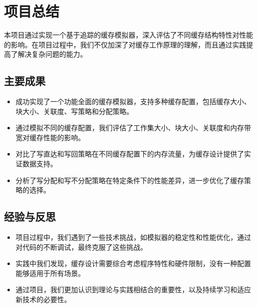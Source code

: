 \documentclass[12pt,hyperref,a4paper,UTF8]{ctexart}
\begin{document}
\section{项目总结}

本项目通过实现一个基于追踪的缓存模拟器，深入评估了不同缓存结构特性对性能的影响。在项目过程中，我们不仅加深了对缓存工作原理的理解，而且通过实践提高了解决复杂问题的能力。

\subsection*{主要成果}
\begin{itemize}
    \item 成功实现了一个功能全面的缓存模拟器，支持多种缓存配置，包括缓存大小、块大小、关联度、写策略和分配策略。
    \item 通过模拟不同的缓存配置，我们评估了工作集大小、块大小、关联度和内存带宽对缓存性能的影响。
    \item 对比了写直达和写回策略在不同缓存配置下的内存流量，为缓存设计提供了实证数据支持。
    \item 分析了写分配和写不分配策略在特定条件下的性能差异，进一步优化了缓存策略的选择。
\end{itemize}

\subsection*{经验与反思}
\begin{itemize}
    \item 项目过程中，我们遇到了一些技术挑战，如模拟器的稳定性和性能优化，通过对代码的不断调试，最终克服了这些挑战。
    \item 实践中我们发现，缓存设计需要综合考虑程序特性和硬件限制，没有一种配置能够适用于所有场景。
    \item 通过项目，我们更加认识到理论与实践相结合的重要性，以及持续学习和适应新技术的必要性。
\end{itemize}




\end{document}
